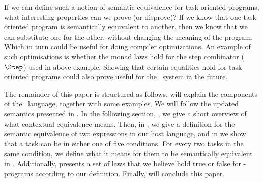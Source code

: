 

If we can define such a notion of semantic equivalence for task-oriented programs, what interesting properties can we prove (or disprove)?
If we know that one task-oriented program is semantically equivalent to another, then we know that we can substitute one for the other, without changing the meaning of the program.
Which in turn could be useful for doing compiler optimizations.
An example of such optimisations is whether the monad laws hold for the step combinator ($\Step$) used in above example.
Showing that certain equalities hold for task-oriented programs could also prove useful for the \ITASKS\ system in the future.



The remainder of this paper is structured as follows.
 will explain the components of the \TOPHAT\ language,
together with some examples.
We will follow the updated semantics presented in \inlinecite[Steenvoorden22].
%
In the following section, , we give a short overview of what contextual equivalence means.
Then, in , we give a definition for the semantic equivalence of two expressions in our host language,
and in  we show that a task can be in either one of five conditions.
For every two tasks in the same condition, we define what it means for them to be semantically equivalent in .
Additionally,  presents a set of laws that we believe hold true or false for \TOPHAT-programs according to our definition.
Finally,  will conclude this paper.
